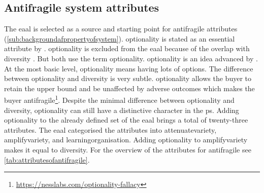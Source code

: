 \subsection{Antifragile system attributes}
\label{sub:attributesofantifragile}
The \acrlong{eaal} is selected as a source and starting point for \gls{antifragile} attributes (\cref{sub:backgroundafpropertyofsystem}). \Gls{optionality} is stated as an essential attribute by \textcites{Taleb2012}[p.~64]{Botjes2020}. \Gls{optionality} is excluded from the \acrlong{eaal} because of the overlap with \gls{diversity} \parencite[p.~64]{Botjes2020}. But \textcites{Taleb2012}[p.~9]{Gorgeon2015} both use the term \gls{optionality}. \Gls{optionality} is an idea advanced by \textcite{Taleb2012}. At the most basic level, \gls{optionality} means having lots of options. The difference between \gls{optionality} and \gls{diversity} is very subtle. \Gls{optionality} allows the buyer to retain the upper bound and be unaffected by adverse outcomes which makes the buyer \gls{antifragile}\footnote{\label{foot:nesslabs}\url{https://nesslabs.com/optionality-fallacy}}. Despite the minimal difference between \gls{optionality} and \gls{diversity}, \gls{optionality} can still have a distinctive character in the \gls{ps}. Adding \gls{optionality} to the already defined set of the \acrlong{eaal} brings a total of twenty-three attributes. The \acrlong{eaal} categorised the attributes into \gls{attenuatevariety}, \gls{amplifyvariety}, and \gls{learningorganisation}. Adding \gls{optionality} to \gls{amplifyvariety} makes it equal to \gls{diversity}. For the overview of the \glspl{attribute} for \gls{antifragile} see \cref{tab:attributesofantifragile}. 
